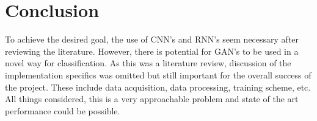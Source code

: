 \documentclass[12pt]{article}
\theoremstyle{colon}
\begin{document}
\section{Conclusion}

To achieve the desired goal, the use of CNN's and RNN's seem necessary after reviewing the literature. However, there is potential for GAN's to be used in a novel way for classification. As this was a literature review, discussion of the implementation specifics was omitted but still important for the overall success of the project. These include data acquisition, data processing, training scheme, etc. All things considered, this is a very approachable problem and state of the art performance could be possible.

\clearpage



\end{document}
